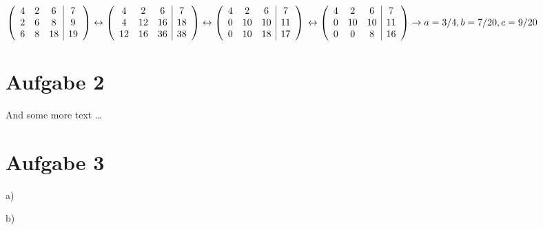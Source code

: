 \documentclass[10pt,a4paper]{article}
\begin{document}
$
\left(
\begin{array}{ccc | c}
    4 & 2 & 6 & 7\\
    2 & 6 & 8 & 9\\
    6 & 8 & 18 & 19
\end{array}
\right) \leftrightarrow
\left(
\begin{array}{ccc | c}
    4 & 2 & 6 & 7\\
    4 & 12 & 16 & 18\\
    12 & 16 & 36 & 38
\end{array}
\right)  \leftrightarrow
\left(
\begin{array}{ccc | c}
    4 & 2 & 6 & 7\\
    0 & 10 & 10 & 11\\
    0 & 10 & 18 & 17
\end{array}
\right)  
\\\leftrightarrow
\left(
\begin{array}{ccc | c}
    4 & 2 & 6 & 7\\
    0 & 10 & 10 & 11\\
    0 & 0 & 8 & 16
\end{array}
\right) \rightarrow a = 3/4, b = 7/20, c = 9/20\\
$

\section*{Aufgabe 2}
And some more text \ldots

\section*{Aufgabe 3}
a)

b)

\end{document}
